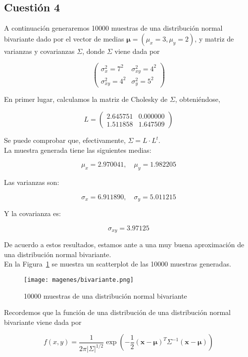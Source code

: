 \documentclass[12pt,a4paper,twoside,openright,titlepage,final]{article}
\begin{document}
\subsection{Cuestión 4}

A continuación generaremos 10000 muestras de una distribución normal bivariante dado por el vector de medias $\mathbf{\mu} = (\mu_x = 3, \mu_y = 2)$, y matriz de varianzas y covarianzas $\Sigma$, donde $\Sigma$ viene dada por

\[ \left( \begin{array}{cc}
\sigma^2_x = 7^2 & \sigma_{xy}^2 = 4^2\\
\sigma_{xy}^2 = 4^2 & \sigma_y^2 = 5^2
\end{array} \right) \]

En primer lugar, calculamos la matriz de Cholesky de $\Sigma$, obteniéndose,

\[ L = \left( \begin{array}{cc}
2.645751 & 0.000000 \\
1.511858 & 1.647509
\end{array} \right) \]

Se puede comprobar que, efectivamente, $\Sigma = L \cdot L^t$.\\

La muestra generada tiene las siguientes medias:

\[\mu_x = 2.970041, \quad \mu_y = 1.982205\]

Las varianzas son:

\[\sigma_x = 6.911890, \quad \sigma_y = 5.011215 \]

Y la covarianza es:

\[ \sigma_{xy} = 3.97125 \]

De acuerdo a estos resultados, estamos ante a una muy buena aproximación de una distribución normal bivariante.\\

En la Figura~\ref{fig:bivariante} se muestra un scatterplot de las 10000 muestras generadas.\\

\begin{figure}[tbph!]
\centering
\texttt{[image: magenes/bivariante.png]}
\caption{10000 muestras de una distribución normal bivariante}
\label{fig:bivariante}
\end{figure}

Recordemos que la función de una distribución de una distribución normal bivariante viene dada por

\[ f(x,y) = \dfrac{1}{2\pi |\Sigma|^{1/2}} \exp \left( -\dfrac{1}{2} (\mathbf{x} - \mathbf{\mu})^T \Sigma^{-1} (\mathbf{x} - \mathbf{\mu}) \right) \] 
\end{document}
